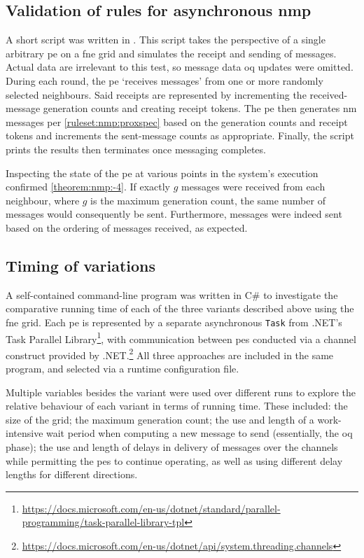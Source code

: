 \subsection{Validation of rules for asynchronous \texorpdfstring{\acrlong{nmp}}{neighbourhood message passing}}
A short script was written in \fsharp{}.  This script takes the perspective of a single arbitrary \gls{pe} on a \gls{fne} grid and simulates the receipt and sending of messages.  Actual data are irrelevant to this test, so message data \gls{oq} updates were omitted.  During each round, the \gls{pe} `receives messages' from one or more randomly selected neighbours.  Said receipts are represented by incrementing the received-message generation counts and creating receipt tokens.  The \gls{pe} then generates \gls{nm} messages per \cref{ruleset:nmp:proxspec} based on the generation counts and receipt tokens and increments the sent-message counts as appropriate.  Finally, the script prints the results then terminates once messaging completes.

Inspecting the state of the \gls{pe} at various points in the system's execution confirmed \cref{theorem:nmp:-4}.  If exactly \(g\) messages were received from each neighbour, where \(g\) is the maximum generation count, the same number of messages would consequently be sent.  Furthermore, messages were indeed sent based on the ordering of messages received, as expected.

\subsection{\label{sec:nmp:timingexp}Timing of variations}
A self-contained command-line program was written in C\# to investigate the comparative running time of each of the three variants described above using the \gls{fne} grid.  Each \gls{pe} is represented by a separate asynchronous \texttt{Task} from .NET's Task Parallel Library{\footnote{\raggedright\url{https://docs.microsoft.com/en-us/dotnet/standard/parallel-programming/task-parallel-library-tpl}}}, with communication between \glspl{pe} conducted via a channel construct provided by .NET.\footnote{\url{https://docs.microsoft.com/en-us/dotnet/api/system.threading.channels}}  All three approaches are included in the same program, and selected via a runtime configuration file.

Multiple variables besides the variant were used over different runs to explore the relative behaviour of each variant in terms of running time.  These included:  the size of the grid; the maximum generation count;  the use and length of a work-intensive wait period when computing a new message to send (essentially, the \gls{oq} phase);  the use and length of delays in delivery of messages over the channels while permitting the \glspl{pe} to continue operating, as well as using different delay lengths for different directions.

